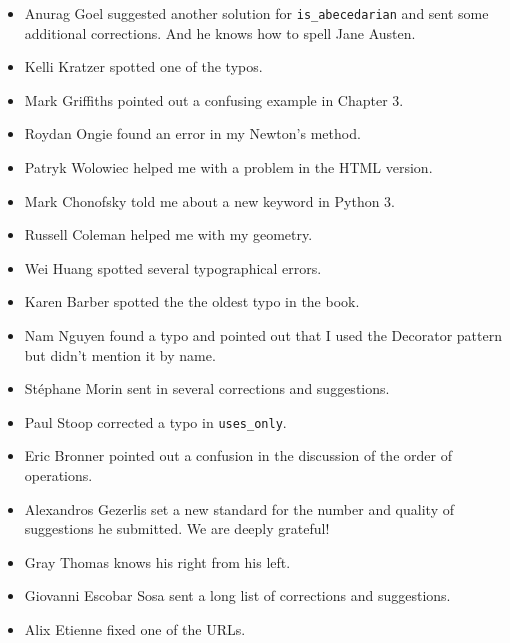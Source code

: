 \begin{itemize}
\item Anurag Goel suggested another solution for \verb"is_abecedarian"
and sent some additional corrections.  And he knows how to
spell Jane Austen.

\item Kelli Kratzer spotted one of the typos.

\item Mark Griffiths pointed out a confusing example in Chapter 3.

\item Roydan Ongie found an error in my Newton's method.

\item Patryk Wolowiec helped me with a problem in the HTML version.

\item Mark Chonofsky told me about a new keyword in Python 3.

\item Russell Coleman helped me with my geometry.

\item Wei Huang spotted several typographical errors.

\item Karen Barber spotted the the oldest typo in the book.

\item Nam Nguyen found a typo and pointed out that I used the Decorator
pattern but didn't mention it by name.

\item St\'{e}phane Morin sent in several corrections and suggestions.

\item Paul Stoop corrected a typo in \verb+uses_only+.

\item Eric Bronner pointed out a confusion in the discussion of the
order of operations.

\item Alexandros Gezerlis set a new standard for the number and
quality of suggestions he submitted.  We are deeply grateful!

\item Gray Thomas knows his right from his left.

\item Giovanni Escobar Sosa sent a long list of corrections and
suggestions.

\item Alix Etienne fixed one of the URLs.


\end{itemize}
